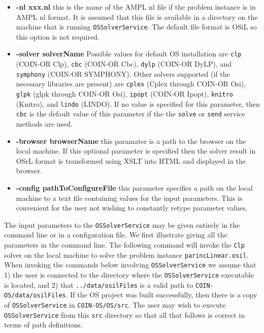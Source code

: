 \documentclass[11pt]{article}
\renewcommand{\_}{{\char"5F}}
\renewcommand{\{}{{\char"7B}}
\renewcommand{\}}{{\char"7D}}
\renewcommand{\^}{{\char"0D}}
\renewcommand{\'}{{\char"0D}}
\begin{document}
\begin{itemize}
\item[] {\bf -nl  xxx.nl}  this is the name of the AMPL nl file if the problem instance is in AMPL nl  format. It is assumed that this file is available in a directory on the machine that is running {\tt OSSolverService}. The default file format is OSiL so this option is not required.

\item[] {\bf -solver  solverName}  Possible values for default OS installation are {\tt clp} (COIN-OR Clp), {\tt cbc} (COIN-OR Cbc), {\tt dylp} (COIN-OR DyLP), and {\tt symphony} (COIN-OR SYMPHONY). Other solvers supported (if the necessary libraries are present) are {\tt cplex} (Cplex through COIN-OR Osi), {\tt glpk} (glpk through COIN-OR Osi), {\tt ipopt} (COIN-OR Ipopt),  {\tt knitro} (Knitro), and {\tt lindo} (LINDO). If no value is specified for this parameter, then {\tt cbc} is the default value of this parameter if the the {\tt solve} or {\tt send} service methods are used.


\item[] {\bf -browser  browserName} this paramater is a path to the browser on the local machine. If this optional parameter is specified then the solver result in OSrL format is transformed using XSLT into HTML and displayed in the browser.

\item[] {\bf -config pathToConfigureFile} this parameter specifies a path on the local machine to a text file containing values for the input parameters. This is convenient for the user not wishing to constantly retype parameter values.

\end{itemize}



The input parameters to the {\tt OSSolverService} may be given entirely in the command line or in a configuration file.  We first illustrate giving all the  parameters in the command line. The following command will invoke the {\tt Clp} solver on the local machine to solve the problem instance {\tt parincLinear.osil}.  When invoking the commands below involving {\tt OSSolverService} we assume that 1) the user is connected to the directory where the {\tt OSSolverService} executable is located, and 2) that {\tt ../data/osilFiles} is a valid path to {\tt COIN-OS/data/osilFiles}.  If the OS project was built successfully, then there is a copy of  {\tt OSSolverService} in {\tt COIN-OS/OS/src}. The user may wish to execute {\tt OSSolverService} from this {\tt src} directory so that all that follows is correct in terms of path definitions.
\end{document}
